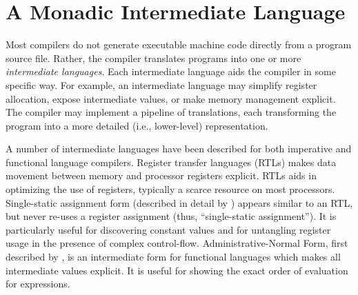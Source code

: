 \documentclass[12pt]{report}
\begin{document}


\chapter{A Monadic Intermediate Language}
\label{ref_chapter_mil}








Most compilers do not generate executable machine code directly from a
program source file. Rather, the compiler translates programs into one
or more \emph{intermediate languages}. Each intermediate language aids
the compiler in some specific way. For
example, an intermediate language may simplify register allocation,
expose intermediate values, or make memory management explicit. The
compiler may implement a pipeline of translations, each transforming
the program into a more detailed (i.e., lower-level) representation.

A number of intermediate languages have been described for both
imperative and functional language compilers. Register transfer
languages (RTLs) makes data movement between memory and processor
registers explicit. RTLs aids in optimizing the use of registers,
typically a scarce resource on most processors. Single-static
assignment form (described in detail by \citet[pg.~252]{Muchnick1998})
appears similar to an RTL, but never re-uses a register assignment
(thus, ``single-static assignment''). It is particularly useful for
discovering constant values and for untangling register usage in the
presence of complex control-flow. Administrative-Normal Form, first
described by \citet{Flanagan1993}, is an intermediate form for
functional languages which makes all intermediate values explicit. It
is useful for showing the exact order of evaluation for expressions.
\end{document}
